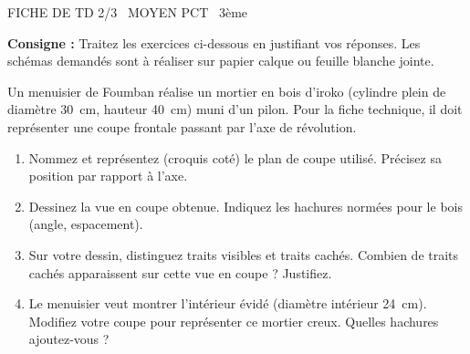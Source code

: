 \documentclass[11pt]{article}
\begin{document}
\begin{tcolorbox}[enhanced,colback=popink,colframe=popink,arc=10pt,boxrule=0pt,left=12pt,right=12pt,top=9pt,bottom=9pt]
{\color{white}\popxbold\small FICHE DE TD 2/3 \textbullet\ MOYEN \hfill PCT \textbullet\ 3ème\par}
\end{tcolorbox}
\vspace{4pt}
\noindent\textbf{Consigne :} Traitez les exercices ci-dessous en justifiant vos réponses. Les schémas demandés sont à réaliser sur papier calque ou feuille blanche jointe.

\begin{exercice}
Un menuisier de Foumban réalise un mortier en bois d'iroko (cylindre plein de diamètre \SI{30}{\centi\metre}, hauteur \SI{40}{\centi\metre}) muni d'un pilon. Pour la fiche technique, il doit représenter une coupe frontale passant par l'axe de révolution.
\begin{enumerate}
    \item Nommez et représentez (croquis coté) le plan de coupe utilisé. Précisez sa position par rapport à l'axe.
    \item Dessinez la vue en coupe obtenue. Indiquez les hachures normées pour le bois (angle, espacement).
    \item Sur votre dessin, distinguez traits visibles et traits cachés. Combien de traits cachés apparaissent sur cette vue en coupe ? Justifiez.
    \item Le menuisier veut montrer l'intérieur évidé (diamètre intérieur \SI{24}{\centi\metre}). Modifiez votre coupe pour représenter ce mortier creux. Quelles hachures ajoutez-vous ?
\end{enumerate}
\end{exercice}
\end{document}
